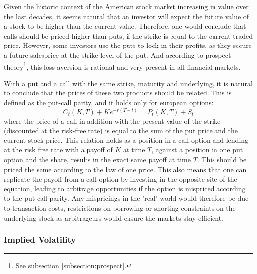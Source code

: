 Given the historic context of the American stock market increasing in value over the last decades, it seems natural that an investor will expect the future value of a stock to be higher than the current value. Therefore, one would conclude that calls should be priced higher than puts, if the strike is equal to the current traded price. However, some investors use the puts to lock in their profits, as they secure a future salesprice at the strike level of the put. And according to prospect theory\footnote{See subsection \ref{subsection:prospect}.}, this loss aversion is rational and very present in all financial markets.

With a put and a call with the same strike, maturity and underlying, it is natural to conclude that the prices of these two products should be related. This is defined as the put-call parity, and it holds only for european options:
\begin{equation}
	C_{t}\left(K,T\right)+Ke^{-r\left(T-t\right)} = P_{t}\left(K,T\right)+S_{t}
\end{equation}
where the price of a call in addition with the present value of the strike (discounted at the risk-free rate) is equal to the sum of the put price and the current stock price. This relation holds as a position in a call option and lending at the risk free rate with a payoff of $K$ at time $T$, against a position in one put option and the share, results in the exact same payoff at time $T$. This should be priced the same according to the law of one price. This also means that one can replicate the payoff from a call option by investing in the opposite site of the equation, leading to arbitrage opportunities if the option is mispriced according to the put-call parity. Any mispricings in the 'real' world would therefore be due to transaction costs, restrictions on borrowing or shorting constraints on the underlying stock as arbitrageurs would ensure the markets stay efficient.

\subsubsection{Implied Volatility}

